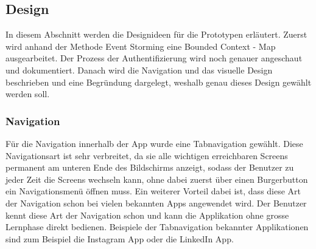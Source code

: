 \subsection{Design}
In diesem Abschnitt werden die Designideen für die Prototypen erläutert. Zuerst wird anhand der Methode Event Storming eine Bounded Context - Map ausgearbeitet. Der Prozess der Authentifizierung wird noch genauer angeschaut und dokumentiert. Danach wird die Navigation und das visuelle Design beschrieben und eine Begründung dargelegt, weshalb genau dieses Design gewählt werden soll.

\subsubsection{Navigation}
Für die Navigation innerhalb der App wurde eine Tabnavigation gewählt. Diese Navigationsart ist sehr verbreitet, da sie alle wichtigen erreichbaren Screens permanent am unteren Ende des Bildschirms anzeigt, sodass der Benutzer zu jeder Zeit die Screens wechseln kann, ohne dabei zuerst über einen Burgerbutton ein Navigationsmenü öffnen muss. Ein weiterer Vorteil dabei ist, dass diese Art der Navigation schon bei vielen bekannten Apps angewendet wird. Der Benutzer kennt diese Art der Navigation schon und kann die Applikation ohne grosse Lernphase direkt bedienen. Beispiele der Tabnavigation bekannter Applikationen sind zum Beispiel die Instagram App oder die LinkedIn App.

